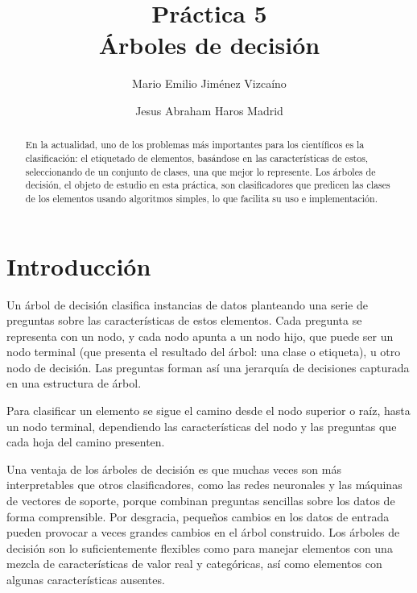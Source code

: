\documentclass[sigconf,authorversion,nonacm]{acmart}
\begin{document}
\title{Práctica 5 \\ Árboles de decisión}

\author{Mario Emilio Jiménez Vizcaíno}

\author{Jesus Abraham Haros Madrid}


\begin{abstract}
  En la actualidad, uno de los problemas más importantes para los científicos es la clasificación: el etiquetado de elementos, basándose en las características de estos, seleccionando de un conjunto de clases, una que mejor lo represente. Los árboles de decisión, el objeto de estudio en esta práctica, son clasificadores que predicen las clases de los elementos usando algoritmos simples, lo que facilita su uso e implementación.
\end{abstract}

\maketitle

\section{Introducción}
Un árbol de decisión clasifica instancias de datos planteando una serie de preguntas sobre las características de estos elementos. Cada pregunta se representa con un nodo, y cada nodo apunta a un nodo hijo, que puede ser un nodo terminal (que presenta el resultado del árbol: una clase o etiqueta), u otro nodo de decisión. Las preguntas forman así una jerarquía de decisiones capturada en una estructura de árbol.

Para clasificar un elemento se sigue el camino desde el nodo superior o raíz, hasta un nodo terminal, dependiendo las características del nodo y las preguntas que cada hoja del camino presenten.

Una ventaja de los árboles de decisión es que muchas veces son más interpretables que otros clasificadores, como las redes neuronales y las máquinas de vectores de soporte\cite{kingsford2008decision}, porque combinan preguntas sencillas sobre los datos de forma comprensible. Por desgracia, pequeños cambios en los datos de entrada pueden provocar a veces grandes cambios en el árbol construido. Los árboles de decisión son lo suficientemente flexibles como para manejar elementos con una mezcla de características de valor real y categóricas, así como elementos con algunas características ausentes.
\end{document}
